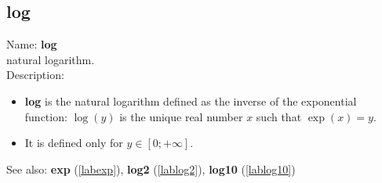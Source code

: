 \subsection{log}
\label{lablog}
\noindent Name: \textbf{log}\\
natural logarithm.\\
\noindent Description: \begin{itemize}

\item \textbf{log} is the natural logarithm defined as the inverse of the exponential
   function: $\log(y)$ is the unique real number $x$ such that $\exp(x)=y$.

\item It is defined only for $y \in [0; +\infty]$.
\end{itemize}
See also: \textbf{exp} (\ref{labexp}), \textbf{log2} (\ref{lablog2}), \textbf{log10} (\ref{lablog10})
